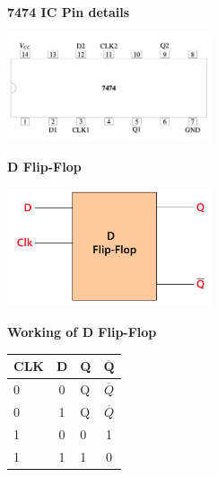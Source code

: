 \documentclass[10pt,a4paper]{report}
\begin{document}
\begin{multicols}{2}
   \vspace{2mm}\textbf{7474 IC Pin details}
 \begin{center}
 \includegraphics[width=0.45\textwidth]{ic.png} 
 \end{center}\vspace{5mm}
  \vspace{2mm}\textbf{D Flip-Flop}
 \begin{center}
 \includegraphics[width=0.45\textwidth]{dff.jpg} 
 \end{center}\vspace{1cm}
 \textbf{Working of D Flip-Flop}

  \setlength{\arrayrulewidth}{0.5mm} \begin{center}
      

  \setlength{\tabcolsep}{25pt}
  \renewcommand{\arraystretch}{1.3}
  \begin{tabular}{|l|c|l|c|}
  \hline 
  \textbf{CLK} & \textbf{D} & \textbf{Q}  & \textbf{$\overline{\textbf{Q}}$}\\
  \hline
    0 & 0 & Q & $\overline{Q}$\\
    0 & 1 & Q & $\overline{Q}$ \\
    1 & 0 & 0 & 1\\
    1 & 1 & 1 & 0\\
    \hline
      \end{tabular}
  \end{center} \vspace{2mm}
  

\end{multicols}
\end{document}
